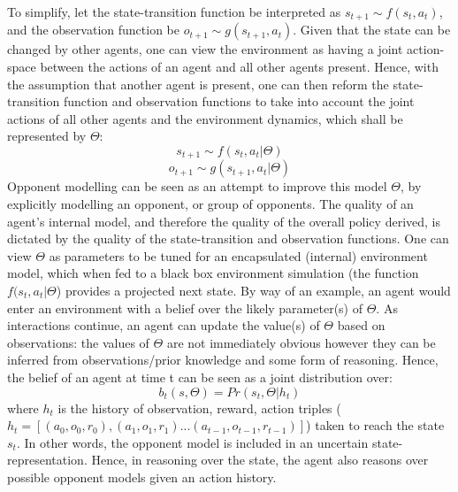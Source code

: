\newline \newline
To simplify, let the state-transition function be interpreted as $s_{t+1} \sim f(s_t,a_t)$, and the observation function be $o_{t+1} \sim g(s_{t+1}, a_t)$. 
\newline \newline
Given that the state can be changed by other agents, one can view the environment as having a joint action-space between the actions of an agent and all other agents present. Hence, with the assumption that another agent is present, one can then reform the state-transition function and observation functions to take into account the joint actions of all other agents and the environment dynamics, which shall be represented by $\Theta$: 
\begin{equation}
    s_{t+1} \sim f(s_t, a_t|\Theta) 
\end{equation}
\begin{equation}
    o_{t+1} \sim g(s_{t+1}, a_t|\Theta) 
\end{equation}
\newline \newline
Opponent modelling can be seen as an attempt to improve this model $\Theta$, by explicitly modelling an opponent, or group of opponents. 
The quality of an agent's internal model, and therefore the quality of the overall policy derived, is dictated by the quality of the state-transition and observation functions. 
\newline \newline
One can view $\Theta$ as parameters to be tuned for an encapsulated (internal) environment model, which when fed to a black box environment simulation (the function $ f(s_t, a_t|\Theta$) provides a projected next state.
\newline \newline
By way of an example, an agent would enter an environment with a belief over the likely parameter(s) of $\Theta$. As interactions continue, an agent can update the value(s) of $\Theta$ based on observations: the values of $\Theta$ are not immediately obvious however they can be inferred from observations/prior knowledge and some form of reasoning. Hence, the belief of an agent at time t can be seen as a joint distribution over:
\begin{equation}
    b_t(s,\Theta) = Pr(s_t,\Theta | h_t)
\end{equation}
where $h_t$ is the history of observation, reward, action triples ($h_t = [(a_0, o_0,r_0), (a_1, o_1, r_1) ... (a_{t-1}, o_{t-1}, r_{t-1})]$) taken to reach the state $s_t$. In other words, the opponent model is included in an uncertain state-representation. Hence, in reasoning over the state, the agent also reasons over possible opponent models given an action history. 

